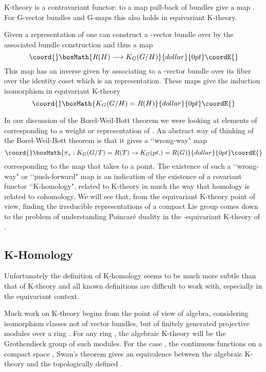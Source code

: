 \documentclass[a4paper,a4paper]{article}
\theoremstyle{conjecture}
\begin{document}
K-theory is a contravariant functor: to a map \coordHE{} pull-back of
bundles give a map \coordHE{}.  For G-vector bundles and
G-maps this also holds in equivariant K-theory.

Given a representation of \coordHE{} one can construct a \coordHE{}-vector bundle
over \coordHE{} by the associated bundle construction and thus a map
$$\coord{}\boxMath{R(H)\longrightarrow K_G(G/H)}{dollar}{0pt}\coordE{}$$
This map has an inverse
given by associating to a \coordHE{}-vector bundle over \coordHE{} its fiber over the
identity coset which is an \coordHE{} representation.  These maps give the induction
isomorphism in equivariant K-theory
$$\coord{}\boxMath{K_G(G/H) = R(H)}{dollar}{0pt}\coordE{}$$

In our discussion of the Borel-Weil-Bott theorem we were looking at elements
of \coordHE{} corresponding to a weight or representation of \coordHE{}.
An abstract way of thinking of the Borel-Weil-Bott theorem is that it
gives a \lq\lq wrong-way" map
$$\coord{}\boxMath{\pi_*:K_G(G/T)=R(T)\rightarrow K_G(pt.)=R(G)}{dollar}{0pt}\coordE{}$$
corresponding to the map \myHighlight{$\pi$}\coordHE{} that takes \coordHE{} to a point.
The existence of such a \lq\lq wrong-way" or \lq\lq push-forward" map is an
indication of the existence of a covariant functor \lq\lq K-homology", related
to K-theory in much the way that homology is related to cohomology.
We will see that, from the equivariant K-theory point of view, finding the irreducible
representations of a compact Lie group comes down to the problem of
understanding Poincar\'e duality in the \coordHE{}-equivariant K-theory of \coordHE{}.

\subsection {K-Homology}

Unfortunately the definition of K-homology seems to be much more subtle
than that of K-theory and all known definitions are difficult to work with,
especially in the equivariant context.

Much work on K-theory begins from the point of view of algebra, considering
isomorphism classes not of vector bundles, but of finitely generated
projective modules over a ring \coordHE{}.  For any ring \coordHE{}, the algebraic K-theory \coordHE{}
will be the Grothendieck group of such modules.
For the case \coordHE{}, the
continuous
functions on a compact space \coordHE{}, Swan's theorem gives an equivalence between
the algebraic K-theory \coordHE{} and the topologically defined \coordHE{}.
\end{document}
